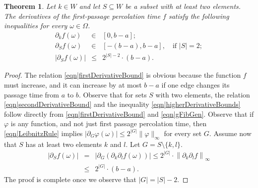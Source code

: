 \documentclass[reqno]{amsart}
\newtheorem{theorem}{Theorem}[section]
\begin{document}
 
\begin{theorem}\label{thm|AbsoluteValueBound}
Let $k\in W$ and let $S\subseteq W$ be a subset with at least two elements. The derivatives of the first-passage percolation time $f$ satisfy the following inequalities for every $\omega\in \Omega$.
\begin{eqnarray}
\partial_kf(\omega)&\in&[0,b-a]; \label{eqn|firstDerivativeBound}\\
\partial_{S}f(\omega)&\in&[-(b-a),b-a],\quad\mbox{if } |S|=2; \label{eqn|secondDerivativeBound}\\
\left|\partial_Sf(\omega)\right|&\leq& 2^{|S|-2}\cdot (b-a).\label{eqn|higherDerivativeBounds}
\end{eqnarray}
\end{theorem}
\begin{proof} The relation \eqref{eqn|firstDerivativeBound} is obvious because the function $f$ must increase, and it can increase by at most $b-a$ if one edge changes its passage time from $a$ to $b$. Observe that for sets $S$ with two elements, the relation \eqref{eqn|secondDerivativeBound} and the inequality \eqref{eqn|higherDerivativeBounds} follow directly from 
\eqref{eqn|firstDerivativeBound} and \eqref{eqn|gFibGen}.   
Observe that if $\varphi$ is any function, and not just first passage percolation time, then \eqref{eqn|LeibnitzRule} implies $|\partial_G\varphi(\omega)|\leq 2^{|G|} \|\varphi\|_{\infty}$ for every set $G$. Assume now that $S$ has at least two elements $k$ and $l$. Let $G=S\setminus\{k,l\}$. 
\begin{eqnarray*}
\left|\partial_Sf(\omega)\right|&=&\left|\partial_G\left(\partial_k\partial_lf(\omega)\right)\right|\leq 2^{|G|}\cdot \left\|\partial_k\partial_lf\right\|_{\infty}\\
&\leq& 2^{|G|}\cdot (b-a).
\end{eqnarray*} The proof is complete once we observe that $|G|=|S|-2$.
\end{proof}
  
\end{document}
